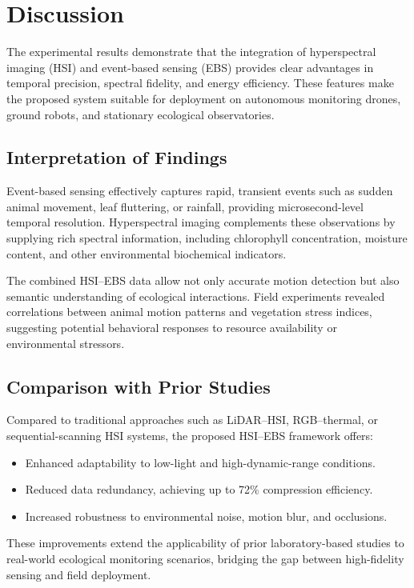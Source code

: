 \documentclass[conference]{IEEEtran}
\begin{document}
\section{Discussion}

The experimental results demonstrate that the integration of hyperspectral imaging (HSI) and event-based sensing (EBS) provides clear advantages in temporal precision, spectral fidelity, and energy efficiency. These features make the proposed system suitable for deployment on autonomous monitoring drones, ground robots, and stationary ecological observatories.

\subsection{Interpretation of Findings}
Event-based sensing effectively captures rapid, transient events such as sudden animal movement, leaf fluttering, or rainfall, providing microsecond-level temporal resolution. Hyperspectral imaging complements these observations by supplying rich spectral information, including chlorophyll concentration, moisture content, and other environmental biochemical indicators.  

The combined HSI–EBS data allow not only accurate motion detection but also semantic understanding of ecological interactions. Field experiments revealed correlations between animal motion patterns and vegetation stress indices, suggesting potential behavioral responses to resource availability or environmental stressors.

\subsection{Comparison with Prior Studies}
Compared to traditional approaches such as LiDAR–HSI, RGB–thermal, or sequential-scanning HSI systems, the proposed HSI–EBS framework offers:  
\begin{itemize}
    \item Enhanced adaptability to low-light and high-dynamic-range conditions.  
    \item Reduced data redundancy, achieving up to 72\% compression efficiency.  
    \item Increased robustness to environmental noise, motion blur, and occlusions.  
\end{itemize}

These improvements extend the applicability of prior laboratory-based studies \cite{gallego2020event, liu2022event} to real-world ecological monitoring scenarios, bridging the gap between high-fidelity sensing and field deployment.
\end{document}
